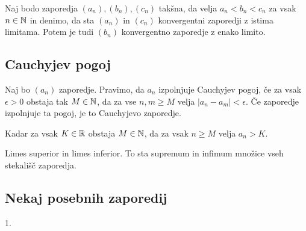 Naj bodo zaporedja $(a_n), (b_n), (c_n)$ takšna, da velja $a_n < b_n < c_n$ za vsak $n \in \mathbb{N}$ in denimo, da sta $(a_n)$ in $(c_n)$ konvergentni zaporedji z istima limitama. Potem je tudi $(b_n)$ konvergentno zaporedje z enako limito.

\subsection{Cauchyjev pogoj}


Naj bo $(a_n)$ zaporedje. Pravimo, da $a_n$ izpolnjuje Cauchyjev pogoj, če za vsak $\epsilon>0$ obstaja tak $M\in\mathbb{N}$, da za vse $n,m\ge M$ velja $|a_n-a_m| < \epsilon$. Če zaporedje izpolnjuje ta pogoj, je to Cauchyjevo zaporedje.


Kadar za vsak $K \in \mathbb{R}$ obstaja $M \in \mathbb{N}$, da za vsak $n\ge M$ velja $a_n > K$.


Limes superior in limes inferior. To sta supremum in infimum množice vseh stekališč zaporedja.

\subsection{Nekaj posebnih zaporedij}


1.